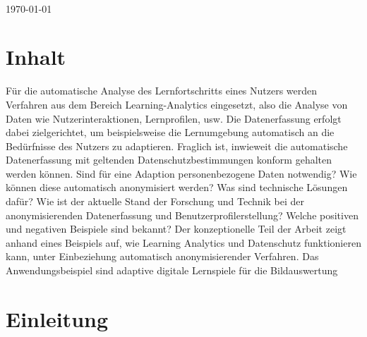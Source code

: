 \documentclass[a4paper, 12pt]{article}
\begin{document}
\begin{titlepage}
\begin{minipage}{0.4\textwidth}
\begin{flushleft}
\end{flushleft}

\end{minipage}\\[2cm]



{\large \today}\\[2cm] %

\vfill %

\end{titlepage}

\tableofcontents

\newpage

\section{Inhalt}

Für die automatische Analyse des Lernfortschritts eines Nutzers werden Verfahren aus dem Bereich Learning-Analytics
eingesetzt, also die Analyse von Daten wie Nutzerinteraktionen, Lernprofilen, usw. Die
Datenerfassung erfolgt dabei zielgerichtet, um beispielsweise die Lernumgebung automatisch an die
Bedürfnisse des Nutzers zu adaptieren. Fraglich ist, inwieweit die automatische Datenerfassung mit
geltenden Datenschutzbestimmungen konform gehalten werden können. Sind für eine Adaption
personenbezogene Daten notwendig? Wie können diese automatisch anonymisiert werden? Was
sind technische Lösungen dafür? Wie ist der aktuelle Stand der Forschung und Technik bei der
anonymisierenden Datenerfassung und Benutzerprofilerstellung? Welche positiven und negativen
Beispiele sind bekannt?
Der konzeptionelle Teil der Arbeit zeigt anhand eines Beispiels auf, wie Learning Analytics und
Datenschutz funktionieren kann, unter Einbeziehung automatisch anonymisierender Verfahren. Das
Anwendungsbeispiel sind adaptive digitale Lernspiele für die Bildauswertung

\section{Einleitung}
\end{document}
